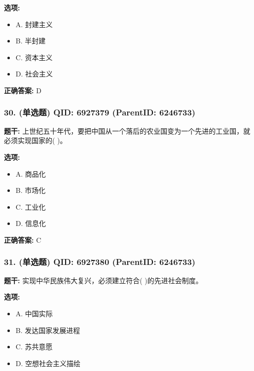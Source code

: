 \documentclass[12pt,UTF8]{ctexart}
\begin{document}
\textbf{选项:}
\begin{itemize}[leftmargin=*]

  \item A. 封建主义

  \item B. 半封建

  \item C. 资本主义

  \item D. 社会主义

\end{itemize}

\textbf{正确答案:}
D

\vspace{0.3em}\hrulefill\vspace{0.7em}

\subsubsection*{30. (单选题) \small QID: 6927379 (ParentID: 6246733)}

\textbf{题干:}
上世纪五十年代，要把中国从一个落后的农业国变为一个先进的工业国，就必须实现国家的(       )。



\textbf{选项:}
\begin{itemize}[leftmargin=*]

  \item A. 商品化

  \item B. 市场化

  \item C. 工业化

  \item D. 信息化

\end{itemize}

\textbf{正确答案:}
C

\vspace{0.3em}\hrulefill\vspace{0.7em}

\subsubsection*{31. (单选题) \small QID: 6927380 (ParentID: 6246733)}

\textbf{题干:}
实现中华民族伟大复兴，必须建立符合(         )的先进社会制度。



\textbf{选项:}
\begin{itemize}[leftmargin=*]

  \item A. 中国实际

  \item B. 发达国家发展进程

  \item C. 苏共意愿

  \item D. 空想社会主义描绘

\end{itemize}
\end{document}
